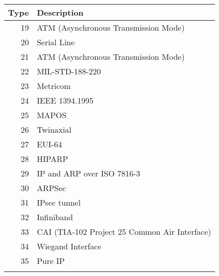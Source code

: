 \documentclass[documentation]{subfiles}
\begin{document}
\begin{minipage}{.46\textwidth}
    \small
    \begin{longtable}{rl}
        \toprule
        {\bf Type} & {\bf Description}\\
        \midrule\endhead%
        19 & ATM (Asynchronous Transmission Mode)\\
        20 & Serial Line\\
        21 & ATM (Asynchronous Transmission Mode)\\
        22 & MIL-STD-188-220\\
        23 & Metricom\\
        24 & IEEE 1394.1995\\
        25 & MAPOS\\
        26 & Twinaxial\\
        27 & EUI-64\\
        28 & HIPARP\\
        29 & IP and ARP over ISO 7816-3\\
        30 & ARPSec\\
        31 & IPsec tunnel\\
        32 & Infiniband\\
        33 & CAI (TIA-102 Project 25 Common Air Interface)\\
        34 & Wiegand Interface\\
        35 & Pure IP\\
        \\
        \bottomrule
    \end{longtable}
\end{minipage}
\end{document}
